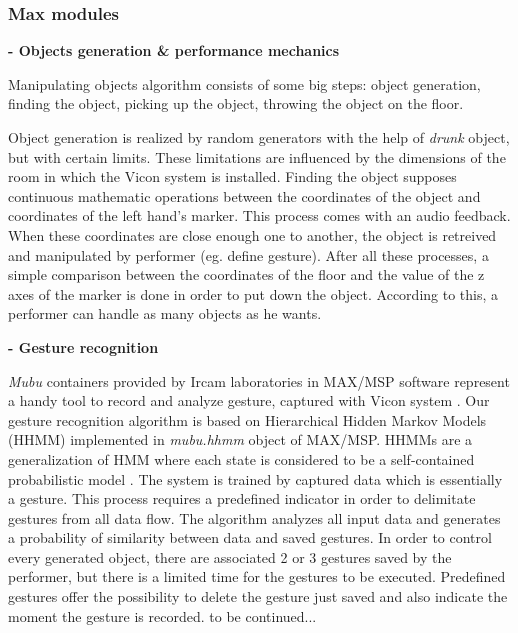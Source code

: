 \documentclass{nime-alternate}
\begin{document}
\subsubsection{Max modules}
\textbf{- Objects generation \& performance mechanics}\\ \par
Manipulating objects algorithm consists of some big steps: object generation, finding the object, picking up the object, throwing the object on the floor. 

Object generation is realized by random generators with the help of \textit{drunk} object, but with certain limits. These limitations are influenced by the dimensions of the room in which the Vicon system is installed. Finding the object supposes continuous mathematic operations between the coordinates of the object and coordinates of the left hand's marker. This process comes with an audio feedback. When these coordinates are close enough one to another, the object is retreived and manipulated by performer (eg. define gesture). After all these processes, a simple comparison between the coordinates of the floor and the value of the z axes of the marker is done in order to put down the object. According to this, a performer can handle as many objects as he wants.\\ \par
\textbf{- Gesture recognition}\\ \par
 \textit{Mubu} containers provided by Ircam laboratories in MAX/MSP software represent a handy tool to record and analyze gesture, captured with Vicon system \cite{mubu}. Our gesture recognition algorithm is based on Hierarchical Hidden Markov Models (HHMM) implemented in \textit{mubu.hhmm} object of MAX/MSP. HHMMs are a generalization of HMM where each state is considered to be a self-contained probabilistic model \cite{hhmm}. The system is trained by captured data which is essentially a gesture. This process requires a predefined indicator in order to delimitate gestures from all data flow. The algorithm analyzes all input data and generates a probability of similarity between data and saved gestures. In order to control every generated object, there are associated 2 or 3 gestures saved by the performer, but there is a limited time for the gestures to be executed. Predefined gestures offer the possibility to delete the gesture just saved and also indicate the moment the gesture is recorded. to be continued...
\end{document}
